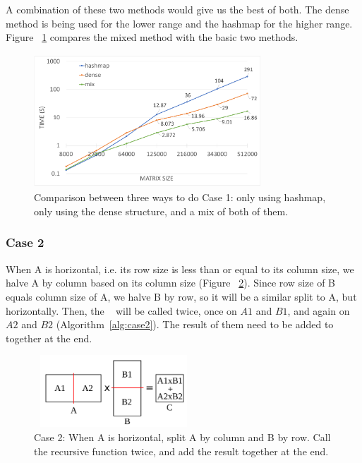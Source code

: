 A combination of these two methods would give us the best of both. The dense method is being used for the lower range and the hashmap for the higher range. Figure ~\ref{fig:mix} compares the mixed method with the basic two methods.

\begin{figure}[tbh]
 \centering
 \includegraphics[width=8.5cm,height=5cm]{./figures/mix.pdf}
 \caption{Comparison between three ways to do Case 1: only using hashmap, only using the dense structure, and a mix of both of them.}
 \label{fig:mix}
\end{figure}


\subsubsection{Case 2}
\label{sec:case2}
When A is horizontal, i.e. its row size is less than or equal to its column size, we halve A by column based on its column size (Figure ~\ref{fig:case2}). Since row size of B equals column size of A, we halve B by row, so it will be a similar split to A, but horizontally.
Then, the \recmm~ will be called twice, once on $A1$ and $B1$, and again on $A2$ and $B2$ (Algorithm~\ref{alg:case2}). The result of them need to be added to together at the end.

\begin{figure}[tbh]
 \centering
 \includegraphics[width=6cm,height=2.7cm]{./figures/case2_001.pdf}
 \caption{Case 2: When A is horizontal, split A by column and B by row. Call the recursive function twice, and add the result together at the end.}
 \label{fig:case2}
\end{figure}

